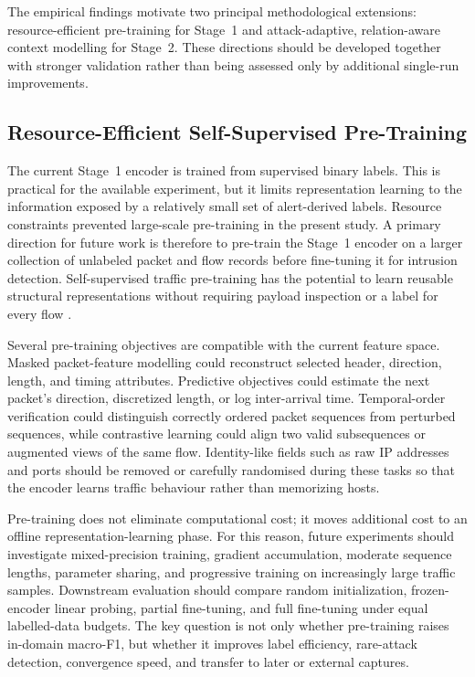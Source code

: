 \documentclass[11pt,fleqn]{report}
\begin{document}
The empirical findings motivate two principal methodological extensions:
resource-efficient pre-training for Stage~1 and attack-adaptive,
relation-aware context modelling for Stage~2. These directions should be
developed together with stronger validation rather than being assessed only by
additional single-run improvements.

\subsection{Resource-Efficient Self-Supervised Pre-Training}
\label{subsubsec:future_pretraining}

The current Stage~1 encoder is trained from supervised binary labels. This is
practical for the available experiment, but it limits representation learning
to the information exposed by a relatively small set of alert-derived labels.
Resource constraints prevented large-scale pre-training in the present study.
A primary direction for future work is therefore to pre-train the Stage~1
encoder on a larger collection of unlabeled packet and flow records before
fine-tuning it for intrusion detection. Self-supervised traffic pre-training has
the potential to learn reusable structural representations without requiring
payload inspection or a label for every flow
\cite{2024MAETraffic,Dong2025EncryptedPretrain}.

Several pre-training objectives are compatible with the current feature space.
Masked packet-feature modelling could reconstruct selected header, direction,
length, and timing attributes. Predictive objectives could estimate the next
packet's direction, discretized length, or log inter-arrival time. Temporal-order
verification could distinguish correctly ordered packet sequences from
perturbed sequences, while contrastive learning could align two valid
subsequences or augmented views of the same flow. Identity-like fields such as
raw IP addresses and ports should be removed or carefully randomised during
these tasks so that the encoder learns traffic behaviour rather than memorizing
hosts.

Pre-training does not eliminate computational cost; it moves additional cost to
an offline representation-learning phase. For this reason, future experiments
should investigate mixed-precision training, gradient accumulation, moderate
sequence lengths, parameter sharing, and progressive training on increasingly
large traffic samples. Downstream evaluation should compare random
initialization, frozen-encoder linear probing, partial fine-tuning, and full
fine-tuning under equal labelled-data budgets. The key question is not only
whether pre-training raises in-domain macro-F1, but whether it improves label
efficiency, rare-attack detection, convergence speed, and transfer to later or
external captures.
\end{document}
